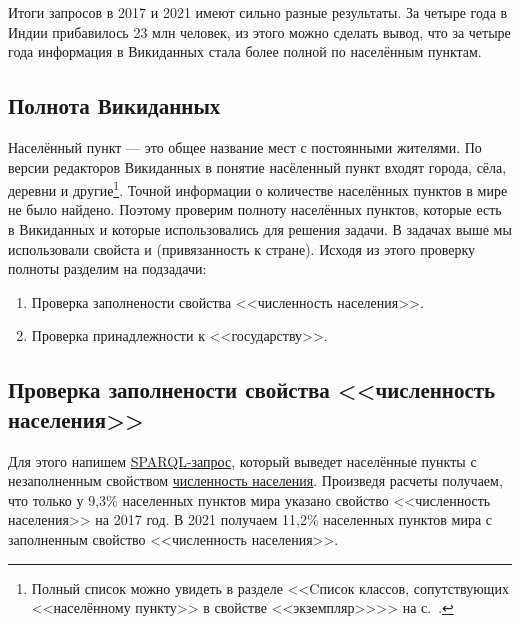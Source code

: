 Итоги запросов в 2017 и 2021 имеют сильно разные результаты. За четыре года в Индии прибавилось 23 млн человек, из этого можно сделать вывод, что за четыре года информация в Викиданных стала более полной по населённым пунктам.

\subsection{Полнота Викиданных}

Населённый пункт — это общее название мест с постоянными жителями\autocite{Humansettlements_Dictionary}. По версии редакторов Викиданных в понятие насёленный пункт входят города, сёла, деревни и другие\footnote{Полный список можно увидеть в разделе <<Cписок классов, сопутствующих <<населённому пункту>> в свойстве <<экземпляр>>>> на с.~\pageref{human-settlement:tag1}.}.
Точной информации о количестве населённых пунктов в мире не было найдено. Поэтому проверим полноту населённых пунктов, которые есть в Викиданных и которые использовались для решения задачи. В задачах выше мы использовали свойста  и  (привязанность к стране). Исходя из этого проверку полноты разделим на подзадачи: 
\begin{enumerate} 
  \item Проверка заполнености свойства <<численность населения>>.
  \item Проверка принадлежности к <<государству>>.
\end{enumerate}

\subsection{Проверка заполнености свойства <<численность населения>> }

Для этого напишем \href{https://w.wiki/4FUz}{SPARQL-запрос}\footnotemark, который выведет населённые пункты с незаполненным свойством \href{http://www.wikidata.org/entity/P1082}{численность населения}. 
Произведя расчеты получаем, что только у 9,3\% населенных пунктов мира указано свойство <<численность населения>> на 2017 год. В 2021 получаем 11,2\% населенных пунктов мира с заполненным свойство <<численность населения>>.

